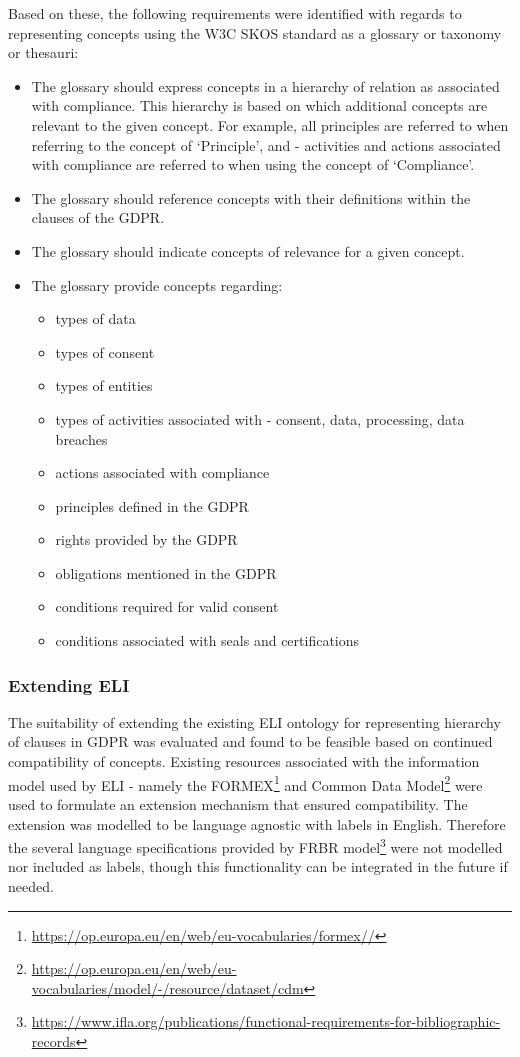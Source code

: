 Based on these, the following requirements were identified with regards to representing concepts using the W3C SKOS standard as a glossary or taxonomy or thesauri:
\begin{itemize}
    \item The glossary should express concepts in a hierarchy of relation as associated with compliance. This hierarchy is based on which additional concepts are relevant to the given concept. For example, all principles are referred to when referring to the concept of `Principle', and - activities and actions associated with compliance are referred to when using the concept of `Compliance'.
    \item The glossary should reference concepts with their definitions within the clauses of the GDPR.
    \item The glossary should indicate concepts of relevance for a given concept.
    \item The glossary provide concepts regarding:
    \begin{itemize}
        \item types of data
        \item types of consent
        \item types of entities
        \item types of activities associated with - consent, data, processing, data breaches
        \item actions associated with compliance
        \item principles defined in the GDPR
        \item rights provided by the GDPR
        \item obligations mentioned in the GDPR
        \item conditions required for valid consent
        \item conditions associated with seals and certifications
    \end{itemize}
\end{itemize}

\subsubsection{Extending ELI}
The suitability of extending the existing ELI ontology for representing hierarchy of clauses in GDPR was evaluated and found to be feasible based on continued compatibility of concepts. Existing resources associated with the information model used by ELI - namely the FORMEX\footnote{\url{https://op.europa.eu/en/web/eu-vocabularies/formex//}} and Common Data Model\footnote{\url{https://op.europa.eu/en/web/eu-vocabularies/model/-/resource/dataset/cdm}} were used to formulate an extension mechanism that ensured compatibility.
The extension was modelled to be language agnostic with labels in English. Therefore the several language specifications provided by FRBR model\footnote{\url{https://www.ifla.org/publications/functional-requirements-for-bibliographic-records}} were not modelled nor included as labels, though this functionality can be integrated in the future if needed.

